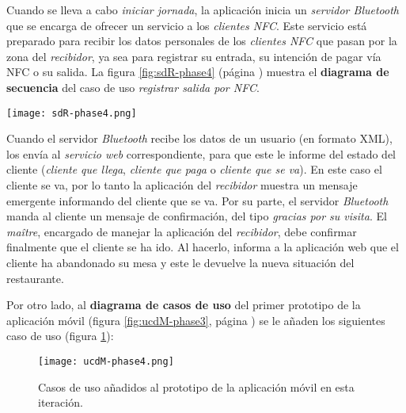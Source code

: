 Cuando se lleva a cabo \emph{iniciar jornada}, la aplicación inicia un
\emph{servidor Bluetooth} que se encarga de ofrecer un servicio a los
\emph{clientes \acs{NFC}}. Este servicio está preparado para recibir
los datos personales de los \emph{clientes \acs{NFC}} que pasan por la
zona del \emph{recibidor}, ya sea para registrar su entrada, su intención de
pagar vía \acs{NFC} o su salida. La figura \ref{fig:sdR-phase4} (página
\pageref{fig:sdR-phase4}) muestra el \textbf{diagrama de secuencia} del
caso de uso \emph{registrar salida por \acs{NFC}}.

  \begin{sidewaysfigure}[h]
    \begin{center}
      \texttt{[image: sdR-phase4.png]}
      \caption{Diagrama de secuencia del caso de uso \emph{registrar salida
      por \acs{NFC}}.}
      \label{fig:sdR-phase4}
    \end{center}
  \end{sidewaysfigure}

Cuando el servidor \emph{Bluetooth} recibe los datos de un usuario (en formato
\acs{XML}), los envía al \emph{servicio web} correspondiente, para que este le 
informe del estado del cliente (\emph{cliente que llega}, \emph{cliente que 
paga} o \emph{cliente que se va}). En este caso el cliente se va, por lo tanto 
la aplicación del \emph{recibidor} muestra un mensaje emergente informando
del cliente que se va. Por su parte, el servidor \emph{Bluetooth} manda
al cliente un mensaje de confirmación, del tipo \emph{gracias por su visita}.
El \emph{maître}, encargado de manejar la aplicación del \emph{recibidor},
debe confirmar finalmente que el cliente se ha ido. Al hacerlo, informa
a la aplicación web que el cliente ha abandonado su mesa y este le
devuelve la nueva situación del restaurante.

Por otro lado, al \textbf{diagrama de casos de uso} del primer prototipo
de la aplicación móvil (figura \ref{fig:ucdM-phase3}, página
\pageref{fig:ucdM-phase3}) se le añaden los siguientes caso de uso (figura
\ref{fig:ucdM-phase4}):

  \begin{figure}[H]
    \begin{center}
      \texttt{[image: ucdM-phase4.png]}
      \caption{Casos de uso añadidos al prototipo de la aplicación
      móvil en esta iteración.}
      \label{fig:ucdM-phase4}
    \end{center}
  \end{figure}

